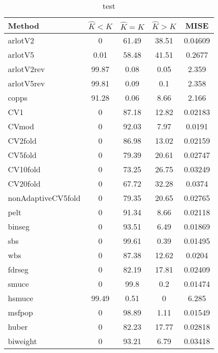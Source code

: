 \begin{table}[ht]
\centering
\begin{tabular}{l|cccc}
  \hline
Method & $\hat{K} < K$ & $\hat{K} = K$ & $\hat{K} > K$ & MISE \\ 
  \hline
arlotV2 &     0 & 61.49 & 38.51 & 0.04609 \\ 
  arlotV5 &  0.01 & 58.48 & 41.51 & 0.2677 \\ 
  arlotV2rev & 99.87 &  0.08 &  0.05 & 2.359 \\ 
  arlotV5rev & 99.81 &  0.09 &   0.1 & 2.358 \\ 
  copps & 91.28 &  0.06 &  8.66 & 2.166 \\ 
  CV1 &     0 & 87.18 & 12.82 & 0.02183 \\ 
  CVmod &     0 & 92.03 &  7.97 & 0.0191 \\ 
  CV2fold &     0 & 86.98 & 13.02 & 0.02159 \\ 
  CV5fold &     0 & 79.39 & 20.61 & 0.02747 \\ 
  CV10fold &     0 & 73.25 & 26.75 & 0.03249 \\ 
  CV20fold &     0 & 67.72 & 32.28 & 0.0374 \\ 
  nonAdaptiveCV5fold &     0 & 79.35 & 20.65 & 0.02765 \\ 
  pelt &     0 & 91.34 &  8.66 & 0.02118 \\ 
  binseg &     0 & 93.51 &  6.49 & 0.01869 \\ 
  sbs &     0 & 99.61 &  0.39 & 0.01495 \\ 
  wbs &     0 & 87.38 & 12.62 & 0.0204 \\ 
  fdrseg &     0 & 82.19 & 17.81 & 0.02409 \\ 
  smuce &     0 &  99.8 &   0.2 & 0.01474 \\ 
  hsmuce & 99.49 &  0.51 &     0 & 6.285 \\ 
  msfpop &     0 & 98.89 &  1.11 & 0.01549 \\ 
  huber &     0 & 82.23 & 17.77 & 0.02818 \\ 
  biweight &     0 & 93.21 &  6.79 & 0.03418 \\ 
   \hline
\end{tabular}
\caption{test} 
\end{table}
